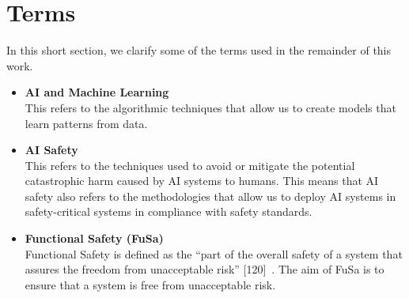 \section{Terms}
In this short section, we clarify some of the terms used in the remainder of this work.
\begin{itemize}
    \item \textbf{AI and Machine Learning} \\
        This refers to the algorithmic techniques that allow us to create models that learn patterns from data.
    \item \textbf{AI Safety} \\
        This refers to the techniques used to avoid or mitigate the potential catastrophic harm caused by AI systems to humans. This means that AI safety also refers to the methodologies that allow us to deploy AI systems in safety-critical systems in compliance with safety standards.
    \item \textbf{Functional Safety (FuSa)} \\
        Functional Safety is defined as the ``part of the overall safety of a system that assures the freedom from unacceptable risk'' [120]~\cite{perez2024artificial}. The aim of FuSa is to ensure that a system is free from unacceptable risk.
\end{itemize}